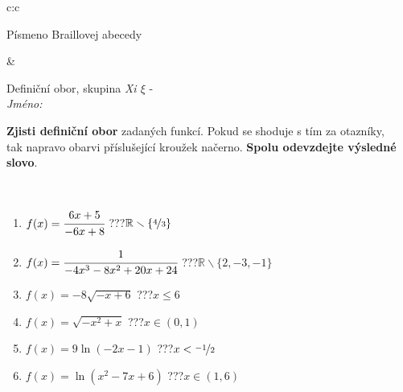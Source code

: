 \documentclass[10pt]{report}
\begin{document}
\begin{tabular}{c:c}
\begin{minipage}[c][104.5mm][t]{0.5\linewidth}
\begin{center}
\begin{minipage}{0.20\linewidth}
\begin{center}
{\small Písmeno Braillovej abecedy}
\end{center}
\end{minipage}
\end{center}
\end{minipage}
&
\begin{minipage}[c][104.5mm][t]{0.5\linewidth}
\begin{center}
\vspace{7mm}
{\huge Definiční obor, skupina \textit{Xi $\xi$} -}\\[5mm]
\textit{Jméno:}\phantom{xxxxxxxxxxxxxxxxxxxxxxxxxxxxxxxxxxxxxxxxxxxxxxxxxxxxxxxxxxxxxxxxx}\\[5mm]
\begin{minipage}{0.95\linewidth}
\begin{center}
\textbf{Zjisti definiční obor} zadaných funkcí. Pokud se shoduje s tím za otazníky,\\tak napravo obarvi příslušející kroužek načerno. \textbf{Spolu odevzdejte výsledné slovo}.
\end{center}
\end{minipage}
\\[1mm]
\begin{minipage}{0.79\linewidth}
\begin{center}
\begin{varwidth}{\linewidth}
\begin{enumerate}
\normalsizerrr
\item $f(x)=\cfrac{6x+5}{-6x+8}$\quad \dotfill\; ???\;\dotfill \quad $\mathbb{R}\smallsetminus\{\nicefrac{4}{3}\}$
\item $f(x)=\cfrac{1}{-4x^3-8x^2+20x+24}$\quad \dotfill\; ???\;\dotfill \quad $\mathbb{R}\smallsetminus\{2,-3,-1\}$
\item $f(x)=-8\sqrt{-x+6}$\quad \dotfill\; ???\;\dotfill \quad $x\leq6$
\item $f(x)=\sqrt{-x^2+x}$\quad \dotfill\; ???\;\dotfill \quad $x\in(0 , 1)$
\item $f(x)=9\ln{(-2x-1)}$\quad \dotfill\; ???\;\dotfill \quad $x<\nicefrac{-1}{2}$
\item $f(x)=\ln{(x^2-7x+6)}$\quad \dotfill\; ???\;\dotfill \quad $x\in(1 , 6)$
\end{enumerate}
\end{varwidth}
\end{center}
\end{minipage}
\begin{minipage}{0.20\linewidth}
\begin{center}

\end{center}
\end{minipage}
\end{center}
\end{minipage}
\end{tabular}
\end{document}
